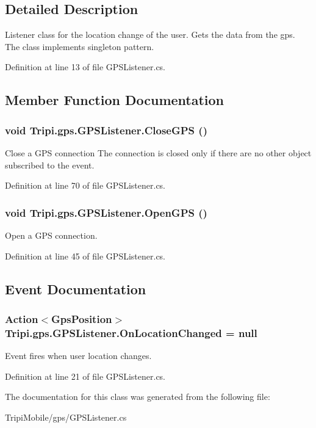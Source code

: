 \subsection{Detailed Description}
Listener class for the location change of the user. Gets the data from the gps. The class implements singleton pattern. 

Definition at line 13 of file GPSListener.cs.

\subsection{Member Function Documentation}
\hypertarget{class_tripi_1_1gps_1_1_g_p_s_listener_a311460b7b647b6dc41bea72902554e78}{
\subsubsection[{CloseGPS}]{\setlength{\rightskip}{0pt plus 5cm}void Tripi.gps.GPSListener.CloseGPS ()}}
\label{class_tripi_1_1gps_1_1_g_p_s_listener_a311460b7b647b6dc41bea72902554e78}


Close a GPS connection The connection is closed only if there are no other object subscribed to the event. 

Definition at line 70 of file GPSListener.cs.\hypertarget{class_tripi_1_1gps_1_1_g_p_s_listener_a4ff986081e6623190ae285cd80ca162e}{
\subsubsection[{OpenGPS}]{\setlength{\rightskip}{0pt plus 5cm}void Tripi.gps.GPSListener.OpenGPS ()}}
\label{class_tripi_1_1gps_1_1_g_p_s_listener_a4ff986081e6623190ae285cd80ca162e}


Open a GPS connection. 

Definition at line 45 of file GPSListener.cs.

\subsection{Event Documentation}
\hypertarget{class_tripi_1_1gps_1_1_g_p_s_listener_ad18f501e60df1dad6c880c9638463139}{
\subsubsection[{OnLocationChanged}]{\setlength{\rightskip}{0pt plus 5cm}Action$<${\bf GpsPosition}$>$ Tripi.gps.GPSListener.OnLocationChanged = null}}
\label{class_tripi_1_1gps_1_1_g_p_s_listener_ad18f501e60df1dad6c880c9638463139}


Event fires when user location changes. 

Definition at line 21 of file GPSListener.cs.

The documentation for this class was generated from the following file:\begin{DoxyCompactItemize}
\item 
TripiMobile/gps/GPSListener.cs\end{DoxyCompactItemize}
